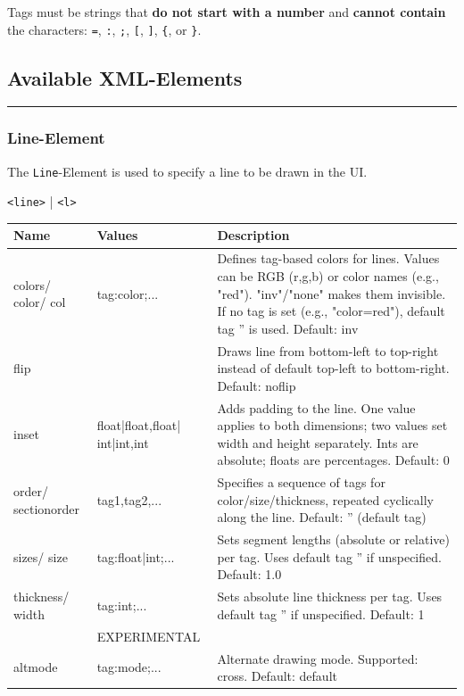 \documentclass[a4paper,11pt]{article}
\begin{document}
Tags must be strings that \textbf{do not start with a number} and \textbf{cannot contain} the characters: \texttt{=}, \texttt{:}, \texttt{;}, \texttt{[}, \texttt{]}, \texttt{\{}, or \texttt{\}}.

\newpage
\subsection*{Available XML-Elements}
\vspace{-1.2em}
\rule{\linewidth}{0.4pt}


\hypertarget{line}{}
\subsubsection*{Line-Element}
The \texttt{Line}-Element is used to specify a line to be drawn in the UI.
\begin{center}
    \texttt{<line>} | \texttt{<l>}
\end{center}

\renewcommand{\arraystretch}{1.3}
\begin{tcolorbox}[colback=white, colframe=black!75, title=Arguments]
\begin{tabularx}{\linewidth}{p{45pt}|p{90pt}|X}
\textbf{Name} & \textbf{Values} & \textbf{Description}\\
\hline
colors/ color/ col & tag:color;... & Defines tag-based colors for lines. Values can be RGB (r,g,b) or color names (e.g., "red"). "inv"/"none" makes them invisible. If no tag is set (e.g., "color=red"), default tag '' is used. Default: inv\\
\rowcolor[HTML]{E8E8E8}
flip & & Draws line from bottom-left to top-right instead of default top-left to bottom-right. Default: noflip\\
inset & float|float,float| int|int,int & Adds padding to the line. One value applies to both dimensions; two values set width and height separately. Ints are absolute; floats are percentages. Default: 0\\
\rowcolor[HTML]{E8E8E8}
order/ sectionorder & tag1,tag2,... & Specifies a sequence of tags for color/size/thickness, repeated cyclically along the line. Default: '' (default tag)\\
sizes/ size & tag:float|int;... & Sets segment lengths (absolute or relative) per tag. Uses default tag '' if unspecified. Default: 1.0\\
\rowcolor[HTML]{E8E8E8}
thickness/ width & tag:int;... & Sets absolute line thickness per tag. Uses default tag '' if unspecified. Default: 1\\
& EXPERIMENTAL & \\
\rowcolor[HTML]{E8E8E8}
altmode & tag:mode;... & Alternate drawing mode. Supported: cross. Default: default
\end{tabularx}
\end{tcolorbox}
\end{document}
